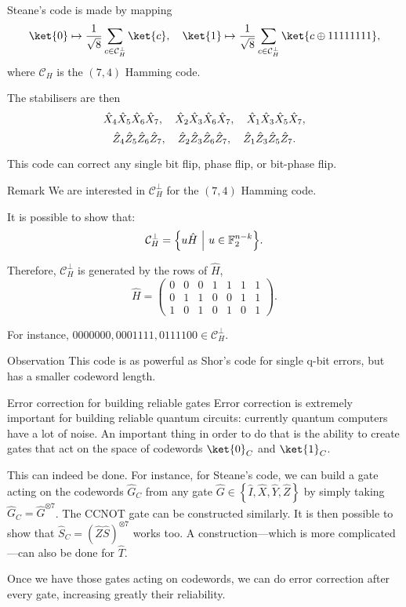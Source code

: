 \documentclass[a4paper]{article}
\begin{document}
\begin{parag}{Steane's code}
     is made by mapping 
    \[\ket{0} \mapsto \frac{1}{\sqrt{8}} \sum_{c \in \mathcal{C}_H^\perp} \ket{c}, \mathspace \ket{1} \mapsto \frac{1}{\sqrt{8}} \sum_{c \in \mathcal{C}_H^\perp} \ket{c \oplus 11111111},\]
    where $\mathcal{C}_H$ is the $\left(7, 4\right)$ Hamming code.

    The stabilisers are then 
    \[\hat{X}_4 \hat{X}_5 \hat{X}_6 \hat{X}_7, \quad \hat{X}_2 \hat{X}_3 \hat{X}_6 \hat{X}_7, \quad \hat{X}_1 \hat{X}_3 \hat{X}_5 \hat{X}_7,\] 
    \[\hat{Z}_4 \hat{Z}_5 \hat{Z}_6 \hat{Z}_7, \quad \hat{Z}_2 \hat{Z}_3 \hat{Z}_6 \hat{Z}_7, \quad \hat{Z}_1 \hat{Z}_3 \hat{Z}_5 \hat{Z}_7.\]
    
    This code can correct any single bit flip, phase flip, or bit-phase flip.
    
    \begin{subparag}{Remark}
        We are interested in $\mathcal{C}_H^\perp$ for the $\left(7, 4\right)$ Hamming code. 

        It is possible to show that: 
        \[\mathcal{C}_H^\perp = \left\{u\hat{H} \suchthat u \in \mathbb{F}_2^{n-k}\right\}.\]

        Therefore, $\mathcal{C}_H^\perp$ is generated by the rows of $\hat{H}$, 
        \[\hat{H} = \begin{pmatrix} 0 & 0 & 0 & 1 & 1 & 1 & 1 \\ 0 & 1 & 1 & 0 & 0 & 1 & 1 \\ 1 & 0 & 1 & 0 & 1 & 0 & 1 \end{pmatrix}  .\]
        
        For instance, $0000000, 0001111, 0111100 \in \mathcal{C}_H^\perp$.
    \end{subparag}

    \begin{subparag}{Observation}
        This code is as powerful as Shor's code for single q-bit errors, but has a smaller codeword length.
    \end{subparag}
\end{parag}

\begin{parag}{Error correction for building reliable gates}
    Error correction is extremely important for building reliable quantum circuits: currently quantum computers have a lot of noise. An important thing in order to do that is the ability to create gates that act on the space of codewords $\ket{0}_C$ and $\ket{1}_C$.

    This can indeed be done. For instance, for Steane's code, we can build a gate acting on the codewords $\hat{G}_C$ from any gate $\hat{G}\in \left\{\hat{I}, \hat{X}, \hat{Y}, \hat{Z}\right\}$ by simply taking $\hat{G}_C = \hat{G}^{\otimes 7}$. The CCNOT gate can be constructed similarly. It is then possible to show that $\hat{S}_C = \left(\hat{Z} \hat{S}\right)^{\otimes 7}$ works too. A construction---which is more complicated---can also be done for $\hat{T}$.

    Once we have those gates acting on codewords, we can do error correction after every gate, increasing greatly their reliability.
\end{parag}
 
\end{document}
